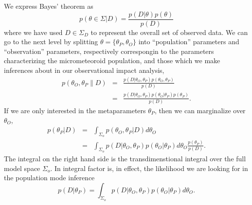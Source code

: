 \documentclass[twocolumn,showpacs,aps,prd,nobibnotes,nofootinbib,floatfix]{revtex4-1}
\begin{document}
We express Bayes' theorem as
\begin{equation}
  p(\theta\in\Sigma|D)=\frac{p(D|\theta)p(\theta)}{p(D)}
\end{equation}
where we have used $D\in\Sigma_D$ to represent the overall set of observed data.  We can go to the next level by splitting $\theta=\{\theta_P,\theta_O\}$ into ``population'' parameters and ``observation'' parameters, respectively correspongin to the parameters characterizing the micrometeoroid population, and those which we make inferences about in our observational impact analysis,
\begin{eqnarray*}
  p(\theta_O,\theta_P\|D)&=&\frac{p(D|\theta_O,\theta_P)p(\theta_O,\theta_P)}{p(D)}\\
  &=&\frac{p(D|\theta_O,\theta_P)p(\theta_O|\theta_P)p(\theta_P)}{p(D)}.
\end{eqnarray*}
If we are only interested in the metaparameters $\theta_P$, then we can marginalize over $\theta_O$,
\begin{eqnarray}
  p(\theta_P|D)&=&\int_{\Sigma_o}p(\theta_O,\theta_P|D)
  d{\theta_O}\\
  &=&\int_{\Sigma_o} p(D|\theta_O,\theta_P)p(\theta_O|\theta_P)d\theta_O\frac{ p(\theta_P)}{p(D)}.
\end{eqnarray} 
The integral on the right hand side is the transdimenstional integral over the full model space $\Sigma_o$.  In integral factor is, in effect, the likelihood we are looking for in the population mode inference
\begin{equation}
  p(D|\theta_P)=\int_{\Sigma_o} p(D|\theta_O,\theta_P)p(\theta_O|\theta_P)d\theta_O.
\end{equation}
\end{document}
